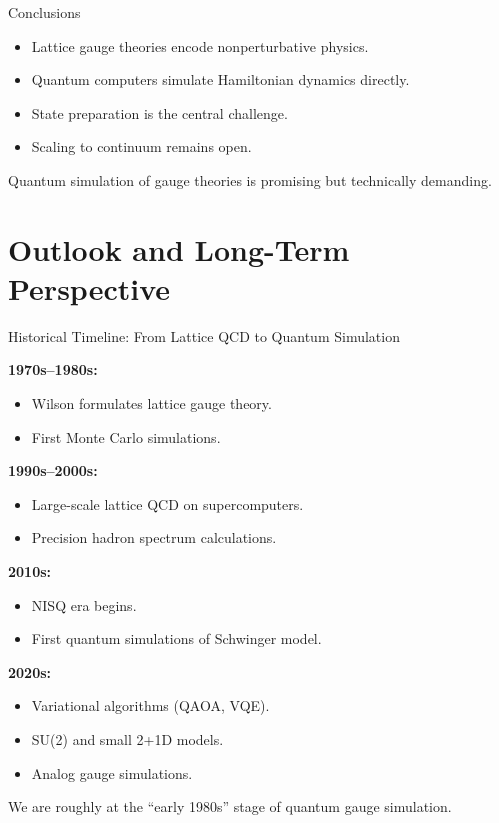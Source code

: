 \documentclass[11pt]{beamer}
\begin{document}
\begin{frame}{Conclusions}

\begin{itemize}
\item Lattice gauge theories encode nonperturbative physics.
\item Quantum computers simulate Hamiltonian dynamics directly.
\item State preparation is the central challenge.
\item Scaling to continuum remains open.
\end{itemize}

Quantum simulation of gauge theories is promising but technically demanding.
\end{frame}



\section{Outlook and Long-Term Perspective}

\begin{frame}{Historical Timeline: From Lattice QCD to Quantum Simulation}

\textbf{1970s–1980s:}
\begin{itemize}
\item Wilson formulates lattice gauge theory.
\item First Monte Carlo simulations.
\end{itemize}

\textbf{1990s–2000s:}
\begin{itemize}
\item Large-scale lattice QCD on supercomputers.
\item Precision hadron spectrum calculations.
\end{itemize}

\textbf{2010s:}
\begin{itemize}
\item NISQ era begins.
\item First quantum simulations of Schwinger model.
\end{itemize}

\textbf{2020s:}
\begin{itemize}
\item Variational algorithms (QAOA, VQE).
\item SU(2) and small 2+1D models.
\item Analog gauge simulations.
\end{itemize}

We are roughly at the “early 1980s” stage of quantum gauge simulation.
\end{frame}
\end{document}
